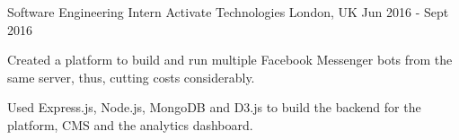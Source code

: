 \begin{cventries}
\cventry
  {Software Engineering Intern}
  {Activate Technologies}
  {London, UK}
  {Jun 2016 - Sept 2016}
  {
    \begin{cvitems}
      \item {Created a platform to build and run multiple Facebook Messenger
        bots from the same server, thus, cutting costs considerably.}
      \item {Used Express.js, Node.js, MongoDB and D3.js to build the backend
        for the platform, CMS and the analytics dashboard.}
    \end{cvitems}
  }


\end{cventries}
